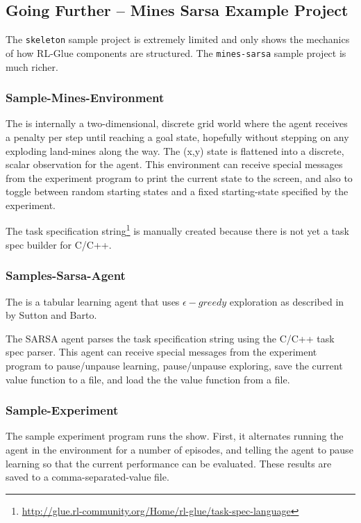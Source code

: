 \documentclass[11pt]{article}
\begin{document}
\subsection{Going Further -- Mines Sarsa Example Project}
\label{mines-sarsa-sample}
The \texttt{skeleton} sample project is extremely limited and only shows the mechanics of how RL-Glue components are structured.  The \texttt{mines-sarsa} sample project is much richer.

\subsubsection{Sample-Mines-Environment}
\label{mines-sample}
The 
is internally a two-dimensional, discrete grid world where the agent receives a penalty per step until reaching a goal state, hopefully without stepping on any exploding land-mines along the way.  The (x,y) state is flattened into a discrete, scalar observation for the agent.  This environment can receive special messages from the experiment program to print the current state to the screen, and also to toggle between random starting states and a fixed starting-state specified by the experiment.

The task specification string\footnote{\url{http://glue.rl-community.org/Home/rl-glue/task-spec-language}} is manually created because there is not yet a task spec builder for C/C++. 

\subsubsection{Samples-Sarsa-Agent}
\label{sarsa-sample}
The 
is a tabular learning agent that uses $\epsilon-greedy$ exploration as described in  by Sutton and Barto.

The SARSA agent parses the task specification string using the C/C++ task spec parser.  This agent can receive special messages from the experiment program to pause/unpause learning, pause/unpause exploring, save the current value function to a file, and load the the value function from a file.

\subsubsection{Sample-Experiment}
The sample experiment program runs the show.  First, it alternates running the agent in the environment for a number of episodes, and telling the agent to pause learning so that the current performance can be evaluated.  These results are saved to a comma-separated-value file.
\end{document}
